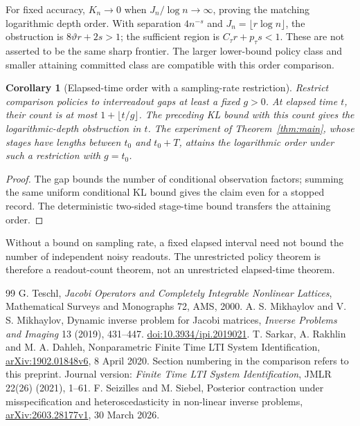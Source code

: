\documentclass[11pt,reqno]{amsart}
\newtheorem{corollary}[theorem]{Corollary}
\theoremstyle{remark}\newtheorem{remark}[theorem]{Remark}
\begin{document}
For fixed accuracy, $K_n\to0$ when $J_n/\log n\to\infty$, proving the
matching logarithmic depth order. With separation $4n^{-s}$ and
$J_n=\lfloor r\log n\rfloor$, the obstruction is $8\vartheta r+2s>1$;
the sufficient region is $C_\tau r+p_\tau s<1$. These are not asserted to be
the same sharp frontier. The larger lower-bound policy class and smaller
attaining committed class are compatible with this order comparison.

\begin{corollary}[Elapsed-time order with a sampling-rate restriction]
\label{cor:time}
Restrict comparison policies to interreadout gaps at least a fixed $g>0$.
At elapsed time $t$, their count is at most $1+\lfloor t/g\rfloor$.
The preceding KL bound with this count gives the logarithmic-depth obstruction
in $t$. The experiment of Theorem~\ref{thm:main}, whose stages have lengths
between $t_0$ and $t_0+T$, attains the logarithmic order under such a restriction
with $g=t_0$.
\end{corollary}
\begin{proof}
The gap bounds the number of conditional observation factors; summing the
same uniform conditional KL bound gives the claim even for a stopped record.
The deterministic two-sided stage-time bound transfers the attaining order.
\end{proof}
Without a bound on sampling rate, a fixed elapsed interval need not bound the
number of independent noisy readouts. The unrestricted policy theorem is
therefore a readout-count theorem, not an unrestricted elapsed-time theorem.

\begin{thebibliography}{99}
 G. Teschl, \emph{Jacobi Operators and Completely Integrable
Nonlinear Lattices}, Mathematical Surveys and Monographs 72, AMS, 2000.
 A. S. Mikhaylov and V. S. Mikhaylov,
Dynamic inverse problem for Jacobi matrices,
\emph{Inverse Problems and Imaging} 13 (2019), 431--447.
\href{https://doi.org/10.3934/ipi.2019021}{doi:10.3934/ipi.2019021}.
 T. Sarkar, A. Rakhlin and M. A. Dahleh,
Nonparametric Finite Time LTI System Identification,
\href{https://arxiv.org/abs/1902.01848v6}{arXiv:1902.01848v6}, 8 April 2020.
Section numbering in the comparison refers to this preprint.
Journal version: \emph{Finite Time LTI System Identification},
JMLR 22(26) (2021), 1--61.
 F. Seizilles and M. Siebel,
Posterior contraction under misspecification and heteroscedasticity in
non-linear inverse problems,
\href{https://arxiv.org/abs/2603.28177v1}{arXiv:2603.28177v1}, 30 March 2026.
\end{thebibliography}
\end{document}
